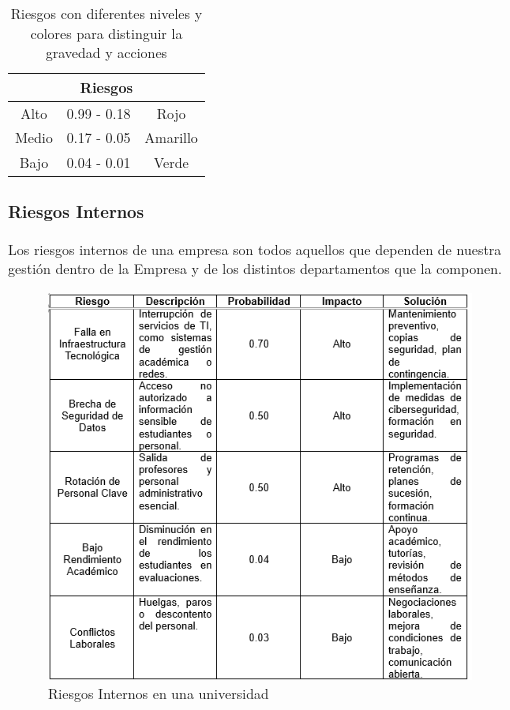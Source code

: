 \begin{table}[h]
        \centering
        \caption{Riesgos con diferentes niveles y colores para distinguir la gravedad y acciones}
        \begin{tabular}{c c c}
        \hline
        \multicolumn{3}{c}{\textbf{Riesgos}}\\
        \hline
             Alto& 0.99 - 0.18 & Rojo  \\
        \hline
             Medio& 0.17 - 0.05 & Amarillo  \\
        \hline
             Bajo& 0.04 - 0.01 & Verde \\
        \hline     
        \end{tabular}
        \label{tab:riego}
    \end{table}
%
%
\subsubsection{Riesgos Internos}

Los riesgos internos de una empresa son todos aquellos que dependen de nuestra gestión dentro de la Empresa y de los distintos departamentos que la componen. \cite{Riesgos}
%
%
\begin{figure}[H]
    \centering
    \includegraphics[scale=0.4]{10/Img/riesgosInternos.png}
    \caption{Riesgos Internos en una universidad}
    \label{fig:riesgosInternos.png}
\end{figure}
%
%
